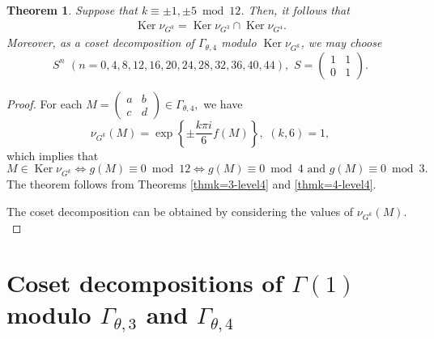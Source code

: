 \documentclass[12pt]{article}
\theoremstyle{definition}
\newtheorem{theorem}{Theorem}
\numberwithin{equation}{section}
\numberwithin{theorem}{section}
\newcommand{\Ker}{\operatorname{Ker}}
\begin{document}
\begin{theorem}
\label{thmk=1and5-level4}
{\it
Suppose that 
$k\equiv \pm1, \pm 5 \bmod{12}$. 
Then, it follows that 
\begin{align*}
\Ker \nu_{G^{k}}
=
\Ker 
\nu_{ G^{3} }
\cap
\Ker \nu_{ G^4 }. 
\end{align*}
Moreover, 
as a coset decomposition of $\Gamma_{\theta,4}$ modulo $\Ker \nu_{G^{k}}$,  
we may choose 
\begin{equation*}
S^{n}  \,\, 
(n=0,4,8,12,16,20,24,28,32,36,40,44),  \,\,
S=
\begin{pmatrix}
1 & 1 \\
0 & 1
\end{pmatrix}. 
\end{equation*}
}
\end{theorem}



\begin{proof}
For each 
$
M
=
\begin{pmatrix}
a & b \\
c & d
\end{pmatrix}
\in
\Gamma_{\theta,4}, 
$ 
we have 
\begin{equation*}
\nu_{ G^{k}  }(M)=
\exp
\left\{
\pm
\frac{
k
 \pi i
}
{6} 
f(M) 
\right\}, \,\,
(k,6)=1, 
\end{equation*}
which implies that 
\begin{equation*}
M
\in
\Ker \nu_{G^{k}}
\Longleftrightarrow 
g(M)\equiv 0 \bmod{12}
\Longleftrightarrow 
g(M)\equiv 0 \bmod{4} \,\,
\mathrm{and} \,\,
g(M)\equiv 0 \bmod{3}. 
\end{equation*}
The theorem follows from Theorems \ref{thmk=3-level4} and \ref{thmk=4-level4}.
\par
The coset decomposition can be obtained by considering the values of $\nu_{ G^{k}  }(M).$
\end{proof}










\section{Coset decompositions of $\Gamma(1) $ modulo $\Gamma_{\theta,3}$ and $\Gamma_{\theta,4}$  }
\label{sec:coset}
\end{document}

